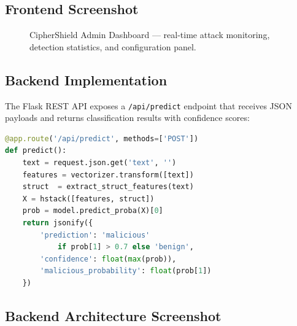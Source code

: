 \documentclass[10pt, twocolumn]{article}
\begin{document}
\subsection{Frontend Screenshot}

\begin{figure}[H]
  \centering
  \caption{CipherShield Admin Dashboard --- real-time attack monitoring, 
           detection statistics, and configuration panel.}
  \label{fig:frontend}
\end{figure}

\subsection{Backend Implementation}

The Flask REST API exposes a \texttt{/api/predict} endpoint that receives 
JSON payloads and returns classification results with confidence scores:

\begin{lstlisting}[language=Python, caption={ML inference endpoint}]
@app.route('/api/predict', methods=['POST'])
def predict():
    text = request.json.get('text', '')
    features = vectorizer.transform([text])
    struct  = extract_struct_features(text)
    X = hstack([features, struct])
    prob = model.predict_proba(X)[0]
    return jsonify({
        'prediction': 'malicious'
            if prob[1] > 0.7 else 'benign',
        'confidence': float(max(prob)),
        'malicious_probability': float(prob[1])
    })
\end{lstlisting}

\subsection{Backend Architecture Screenshot}
\end{document}
